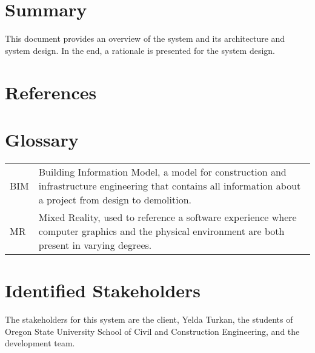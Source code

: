 \documentclass[onecolumn, draftclsnofoot,10pt, compsoc]{IEEEtran}
\begin{document}
\section{Summary}
This document provides an overview of the system and its architecture and system design.
In the end, a rationale is presented for the system design.

\section{References}
\newpage
\section{Glossary}

\begin{tabular}{ p{} p{} }
 BIM & Building Information Model, a model for construction and infrastructure engineering that contains all information about a project from design to demolition. \\
 MR & Mixed Reality, used to reference a software experience where computer graphics and the physical environment are both present in varying degrees.
\end{tabular}

\newpage

\section{Identified Stakeholders}
The stakeholders for this system are the client, Yelda Turkan, the students of Oregon State University School of Civil and Construction Engineering, and the development team.\par

\end{document}
